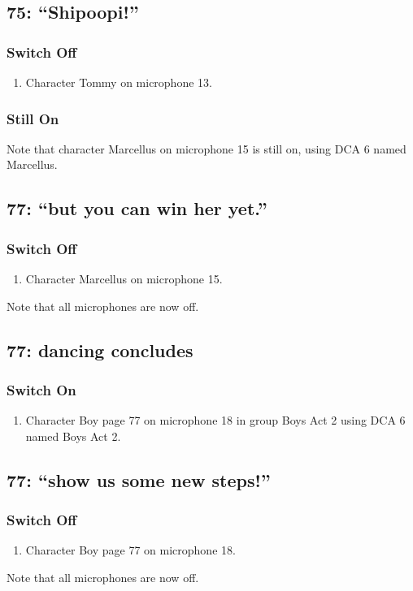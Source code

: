 \subsection* {75: ``Shipoopi!''}
\subsubsection* {Switch Off}
\begin{enumerate}
\item Character Tommy on microphone 13.
\end{enumerate}
\subsubsection* {Still On}
Note that character Marcellus on microphone 15 is still on, using DCA 6 named Marcellus.\subsection* {77: ``but you can win her yet.''}
\subsubsection* {Switch Off}
\begin{enumerate}
\item Character Marcellus on microphone 15.
\end{enumerate}
Note that all microphones are now off.
\subsection* {77: dancing concludes}
\subsubsection* {Switch On}
\begin{enumerate}
\item Character Boy page 77 on microphone 18 in group Boys Act 2 using DCA 6 named Boys Act 2.
\end{enumerate}
\subsection* {77: ``show us some new steps!''}
\subsubsection* {Switch Off}
\begin{enumerate}
\item Character Boy page 77 on microphone 18.
\end{enumerate}
Note that all microphones are now off.
